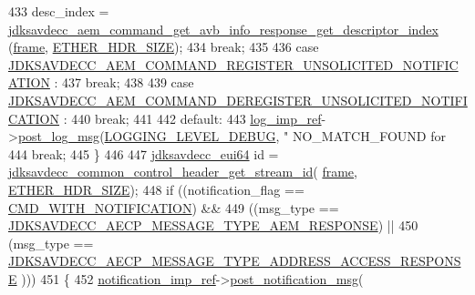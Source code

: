 \begin{DoxyCode}
433         desc\_index = 
      \hyperlink{group__command__get__avb__info__response_gad4356122ebdad47f8c63588a4c48d2e7}{jdksavdecc\_aem\_command\_get\_avb\_info\_response\_get\_descriptor\_index}
      (\hyperlink{gst__avb__playbin_8c_ac8e710e0b5e994c0545d75d69868c6f0}{frame}, \hyperlink{namespaceavdecc__lib_a6c827b1a0d973e18119c5e3da518e65ca9512ad9b34302ba7048d88197e0a2dc0}{ETHER\_HDR\_SIZE});
434         \textcolor{keywordflow}{break};
435 
436     \textcolor{keywordflow}{case} \hyperlink{group__command_ga3e96622fb21f8a15740b8a3c6536dd00}{JDKSAVDECC\_AEM\_COMMAND\_REGISTER\_UNSOLICITED\_NOTIFICATION}
      :
437         \textcolor{keywordflow}{break};
438 
439     \textcolor{keywordflow}{case} \hyperlink{group__command_gaf60a3f35dcf29df8b09a17e9278952ae}{JDKSAVDECC\_AEM\_COMMAND\_DEREGISTER\_UNSOLICITED\_NOTIFICATION}
      :
440         \textcolor{keywordflow}{break};
441 
442     \textcolor{keywordflow}{default}:
443         \hyperlink{namespaceavdecc__lib_acbe3e2a96ae6524943ca532c87a28529}{log\_imp\_ref}->\hyperlink{classavdecc__lib_1_1log_a68139a6297697e4ccebf36ccfd02e44a}{post\_log\_msg}(\hyperlink{namespaceavdecc__lib_a501055c431e6872ef46f252ad13f85cdae3138c2a0a71a6404155ff912e450406}{LOGGING\_LEVEL\_DEBUG}, \textcolor{stringliteral}{"
      NO\_MATCH\_FOUND for %
444         \textcolor{keywordflow}{break};
445     \}
446 
447     \hyperlink{structjdksavdecc__eui64}{jdksavdecc\_eui64} \textcolor{keywordtype}{id} = 
      \hyperlink{group__jdksavdecc__avtp__common__control__header_ga99181000ee374936c8518f657fa9f5cd}{jdksavdecc\_common\_control\_header\_get\_stream\_id}(
      \hyperlink{gst__avb__playbin_8c_ac8e710e0b5e994c0545d75d69868c6f0}{frame}, \hyperlink{namespaceavdecc__lib_a6c827b1a0d973e18119c5e3da518e65ca9512ad9b34302ba7048d88197e0a2dc0}{ETHER\_HDR\_SIZE});
448     \textcolor{keywordflow}{if} ((notification\_flag == \hyperlink{namespaceavdecc__lib_aabcadff06aa62be0ce47bc0646823604aba48b8a017e06fb240b650cdea965178}{CMD\_WITH\_NOTIFICATION}) &&
449         ((msg\_type == \hyperlink{group__aecp__message__type_ga9cad401e0f60634a8f084d93b0374d31}{JDKSAVDECC\_AECP\_MESSAGE\_TYPE\_AEM\_RESPONSE}) 
      ||
450          (msg\_type == \hyperlink{group__aecp__message__type_ga4d8df21361c95f23016e03d0ef625dc0}{JDKSAVDECC\_AECP\_MESSAGE\_TYPE\_ADDRESS\_ACCESS\_RESPONSE}
      )))
451     \{
452         \hyperlink{namespaceavdecc__lib_aca078f7550e970a17b3f732c26bc3d83}{notification\_imp\_ref}->\hyperlink{classavdecc__lib_1_1notification_a2775ca78354ea78d68bf107c084b3822}{post\_notification\_msg}(
}
\end{DoxyCode}
